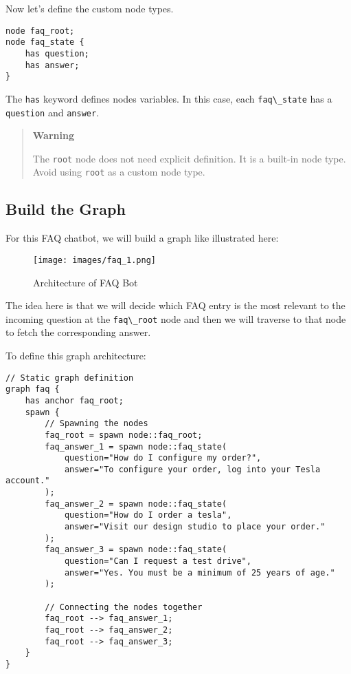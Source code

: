 Now let's define the custom node types.

\begin{lstlisting}
node faq_root;
node faq_state {
    has question;
    has answer;
}
\end{lstlisting}

The \passthrough{\lstinline!has!} keyword defines nodes variables. In
this case, each \passthrough{\lstinline!faq\_state!} has a
\passthrough{\lstinline!question!} and \passthrough{\lstinline!answer!}.

\begin{quote}
\textbf{Warning}

The \passthrough{\lstinline!root!} node does not need explicit
definition. It is a built-in node type. Avoid using
\passthrough{\lstinline!root!} as a custom node type.
\end{quote}

\hypertarget{build-the-graph}{%
\subsection{Build the Graph}\label{build-the-graph}}

For this FAQ chatbot, we will build a graph like illustrated here:

\begin{figure}
\centering
\texttt{[image: images/faq\_1.png]}
\caption{Architecture of FAQ Bot}
\end{figure}

The idea here is that we will decide which FAQ entry is the most
relevant to the incoming question at the
\passthrough{\lstinline!faq\_root!} node and then we will traverse to
that node to fetch the corresponding answer.

To define this graph architecture:

\begin{lstlisting}
// Static graph definition
graph faq {
    has anchor faq_root;
    spawn {
        // Spawning the nodes
        faq_root = spawn node::faq_root;
        faq_answer_1 = spawn node::faq_state(
            question="How do I configure my order?",
            answer="To configure your order, log into your Tesla account."
        );
        faq_answer_2 = spawn node::faq_state(
            question="How do I order a tesla",
            answer="Visit our design studio to place your order."
        );
        faq_answer_3 = spawn node::faq_state(
            question="Can I request a test drive",
            answer="Yes. You must be a minimum of 25 years of age."
        );

        // Connecting the nodes together
        faq_root --> faq_answer_1;
        faq_root --> faq_answer_2;
        faq_root --> faq_answer_3;
    }
}
\end{lstlisting}

